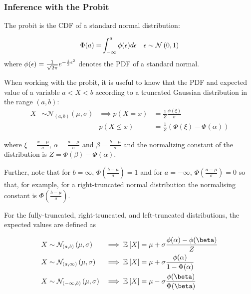 \subsubsection{Inference with the Probit}
The probit is the CDF of a standard normal distribution:

\begin{align}
\Phi(a) = & \int_{-\infty}^{a} \phi(\epsilon) d\epsilon & \epsilon \sim \mathcal{N} \left( {0}, {1} \right)
\end{align}
where $\phi(\epsilon) = \frac{1}{\sqrt{2\pi}} e^{-\frac{1}{2} \epsilon ^2}$ denotes the PDF of a standard normal. %

When working with the probit, it is useful to know that the PDF and expected value of a variable $a < X < b$ according to a truncated Gaussian distribution in the range $(a,b)$:
\begin{align}
X & \sim \mathcal{N}_{(a,b)}\left(\mu, \sigma \right) & \implies p(X = x) & = \frac{1}{Z} \frac{\phi (\xi)}{\sigma} \\
 & & p(X \leq x) & = \frac{1}{Z} \left( \Phi(\xi) - \Phi(\alpha)\right)
\end{align}

where $\xi = \frac{x - \mu}{\sigma}$, $\alpha = \frac{a - \mu}{\sigma}$ and $\beta = \frac{b - \mu}{\sigma}$ and the normalizing constant of the distribution is $Z = \Phi(\beta) - \Phi(\alpha)$. 

Further, note that for $b = \infty$, $\Phi(\frac{b-\mu}{\sigma}) = 1$ and for $a = -\infty$, $\Phi(\frac{a-\mu}{\sigma}) = 0$ so that, for example, for a right-truncated normal distribution the normalising constant is $\Phi(\frac{b - \mu}{\sigma})$.

For the fully-truncated, right-truncated, and left-truncated distributions, the expected values are defined as

\begin{align}
X & \sim \mathcal{N}_{(a,b)}\left(\mu, \sigma \right) & \implies \ex{X}{} & = \mu + \sigma \frac{\phi(\alpha) - \phi(\beta)}{Z} \label{eqn:full-trunc-mean} \\ 
X & \sim \mathcal{N}_{(a,\infty)}\left(\mu, \sigma \right) & \implies \ex{X}{} & = \mu + \sigma \frac{\phi(\alpha)}{1 - \Phi(\alpha)} \label{eqn:left-trunc-mean} \\
X & \sim \mathcal{N}_{(-\infty,b)}\left(\mu, \sigma \right) & \implies \ex{X}{} & = \mu - \sigma\frac{\phi(\beta)}{\Phi(\beta)} \label{eqn:right-trunc-mean}
\end{align}


